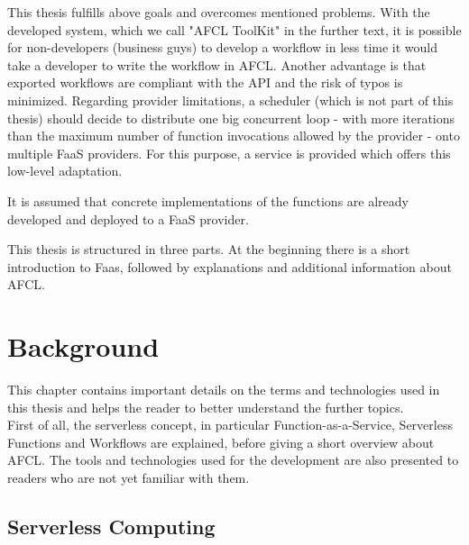 \documentclass[a4paper,12pt,pdftex,halfparskip,cleardoubleempty,bibtotoc,liststotoc]{scrbook}
\begin{document}
This thesis fulfills above goals and overcomes mentioned problems.
With the developed system, which we call "AFCL ToolKit" in the further text, it is possible for non-developers (business guys) to develop a workflow in less time it would take a developer to write the workflow in AFCL.
Another advantage is that exported workflows are compliant with the API and the risk of typos is minimized.
Regarding provider limitations, a scheduler (which is not part of this thesis) should decide to distribute one big concurrent loop - with more iterations than the maximum number of function invocations allowed by the provider - onto multiple FaaS providers. For this purpose, a service is provided which offers this low-level adaptation.


It is assumed that concrete implementations of the functions are already developed and deployed to a FaaS provider.


This thesis is structured in three parts. At the beginning there is a short introduction to Faas, followed by explanations and additional information about AFCL.

\chapter{Background}

This chapter contains important details on the terms and technologies used in this thesis and helps the reader to better understand the further topics.\\
First of all, the serverless concept, in particular Function-as-a-Service, Serverless Functions and Workflows are explained, before giving a short overview about AFCL. The tools and technologies used for the development are also presented to readers who are not yet familiar with them.

\section{Serverless Computing}
\end{document}
